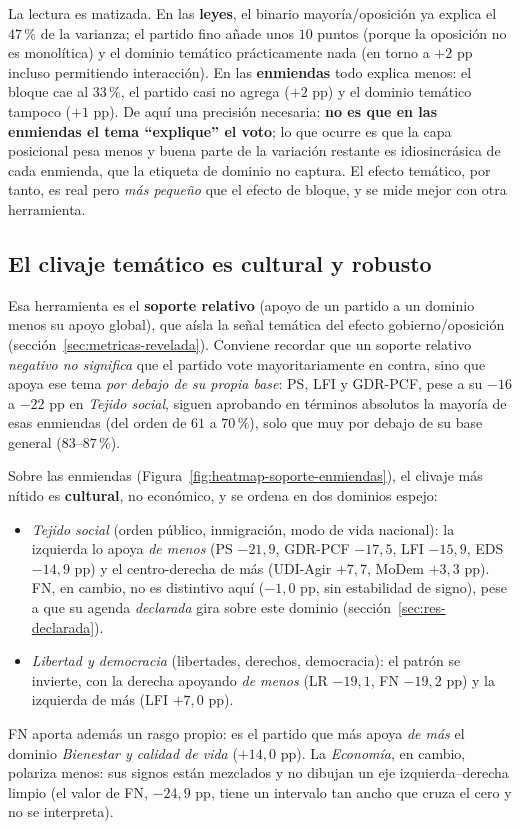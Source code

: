La lectura es matizada. En las \textbf{leyes}, el binario mayoría/oposición ya
explica el $47\,\%$ de la varianza; el partido fino añade unos $10$ puntos
(porque la oposición no es monolítica) y el dominio temático prácticamente nada
(en torno a $+2$ pp incluso permitiendo interacción). En las \textbf{enmiendas}
todo explica menos: el bloque cae al
$33\,\%$, el partido casi no agrega ($+2$ pp) y el dominio temático tampoco
($+1$ pp). De aquí una precisión necesaria: \textbf{no es que en las enmiendas el
tema ``explique'' el voto}; lo que ocurre es que la capa posicional pesa menos y
buena parte de la variación restante es idiosincrásica de cada enmienda, que la
etiqueta de dominio no captura. El efecto temático, por tanto, es real pero
\emph{más pequeño} que el efecto de bloque, y se mide mejor con otra herramienta.

\subsection{El clivaje temático es cultural y robusto}
\label{sec:res-revelada-clivaje}

Esa herramienta es el \textbf{soporte relativo} (apoyo de un partido a un dominio
menos su apoyo global), que aísla la señal temática del efecto gobierno/oposición
(sección~\ref{sec:metricas-revelada}). Conviene recordar que un soporte relativo
\emph{negativo no significa} que el partido vote mayoritariamente en contra, sino
que apoya ese tema \emph{por debajo de su propia base}: PS, LFI y GDR-PCF, pese a
su $-16$ a $-22$ pp en \emph{Tejido social}, siguen aprobando en términos
absolutos la mayoría de esas enmiendas (del orden de $61$ a $70\,\%$), solo que
muy por debajo de su base general ($83$--$87\,\%$).

Sobre las enmiendas (Figura~\ref{fig:heatmap-soporte-enmiendas}), el clivaje más
nítido es \textbf{cultural}, no económico, y se ordena en dos dominios espejo:
\begin{itemize}
  \item \emph{Tejido social} (orden público, inmigración, modo de vida
        nacional): la izquierda lo apoya \emph{de menos} (PS $-21{,}9$,
        GDR-PCF $-17{,}5$, LFI $-15{,}9$, EDS $-14{,}9$ pp) y el centro-derecha
        de más (UDI-Agir $+7{,}7$, MoDem $+3{,}3$ pp). FN, en cambio, no es
        distintivo aquí ($-1{,}0$ pp, sin estabilidad de signo), pese a que su
        agenda \emph{declarada} gira sobre este dominio
        (sección~\ref{sec:res-declarada}).
  \item \emph{Libertad y democracia} (libertades, derechos, democracia): el patrón
        se invierte, con la derecha apoyando \emph{de menos} (LR $-19{,}1$,
        FN $-19{,}2$ pp) y la izquierda de más (LFI $+7{,}0$ pp).
\end{itemize}
FN aporta además un rasgo propio: es el partido que más apoya \emph{de más} el
dominio \emph{Bienestar y calidad de vida} ($+14{,}0$ pp). La \emph{Economía}, en cambio,
polariza menos: sus signos están mezclados y no dibujan un eje izquierda--derecha
limpio (el valor de FN, $-24{,}9$ pp, tiene un intervalo tan ancho que cruza el
cero y no se interpreta).

